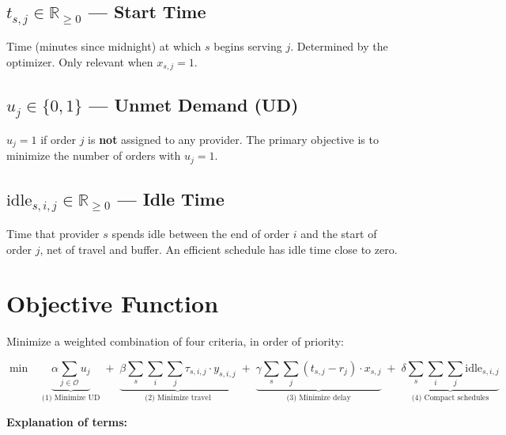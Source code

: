\documentclass[11pt,a4paper]{article}
\begin{document}
\subsection{$t_{s,j} \in \mathbb{R}_{\geq 0}$ --- Start Time}

Time (minutes since midnight) at which $s$ begins serving $j$. Determined by the optimizer. Only relevant when $x_{s,j} = 1$.

\subsection{$u_j \in \{0,1\}$ --- Unmet Demand (UD)}

$u_j = 1$ if order $j$ is \textbf{not} assigned to any provider. The primary objective is to minimize the number of orders with $u_j = 1$.

\subsection{$\text{idle}_{s,i,j} \in \mathbb{R}_{\geq 0}$ --- Idle Time}

Time that provider $s$ spends idle between the end of order $i$ and the start of order $j$, net of travel and buffer. An efficient schedule has idle time close to zero.

\section{Objective Function}

Minimize a weighted combination of four criteria, in order of priority:

\begin{highlight}
\begin{equation}
\min \quad
\underbrace{\alpha \sum_{j \in \mathcal{O}} u_j}_{\text{(1) Minimize UD}}
\;+\;
\underbrace{\beta \sum_{s} \sum_{i} \sum_{j} \tau_{s,i,j} \cdot y_{s,i,j}}_{\text{(2) Minimize travel}}
\;+\;
\underbrace{\gamma \sum_{s} \sum_{j} (t_{s,j} - r_j) \cdot x_{s,j}}_{\text{(3) Minimize delay}}
\;+\;
\underbrace{\delta \sum_{s} \sum_{i} \sum_{j} \text{idle}_{s,i,j}}_{\text{(4) Compact schedules}}
\end{equation}
\end{highlight}

\textbf{Explanation of terms:}
\end{document}
